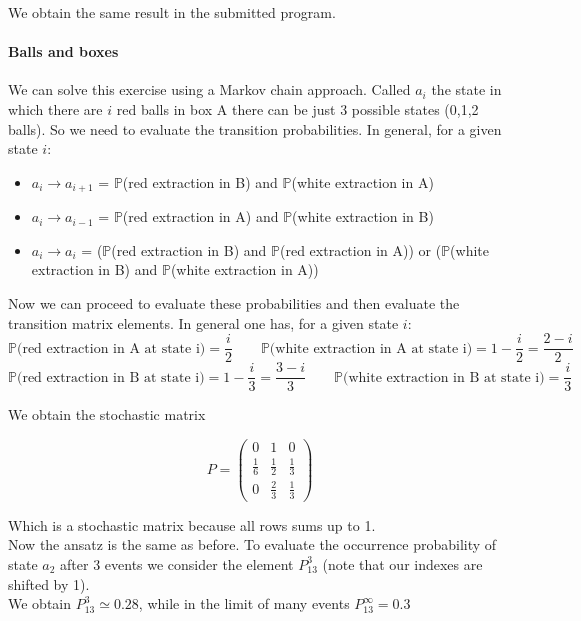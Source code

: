 We obtain the same result in the submitted program.

\paragraph*{Balls and boxes}

We can solve this exercise using a Markov chain approach.
Called $a_i$ the state in which there are $i$ red balls in box A there can be just 3 possible states (0,1,2 balls).
So we need to evaluate the transition probabilities. In general, for a given state $i$:

\begin{itemize}
\item  $a_i \to a_{i+1}$ = $\mathbb{P}$(red extraction in B) and $\mathbb{P}$(white extraction in A)
\item  $a_i \to a_{i-1}$ = $\mathbb{P}$(red extraction in A) and $\mathbb{P}$(white extraction in B)
\item  $a_i \to a_{i}$ = ($\mathbb{P}$(red extraction in B) and $\mathbb{P}$(red extraction in A)) or ($\mathbb{P}$(white extraction in B) and $\mathbb{P}$(white extraction in A))
\end{itemize}

Now we can proceed to evaluate these probabilities and then evaluate the transition matrix elements.
In general one has, for a given state $i$:
$$ \mathbb{P}\text{(red extraction in A at state i)} = \frac{i}{2} \qquad \mathbb{P}\text{(white extraction in A at state i)} = 1- \frac{i}{2} = \frac{2-i}{2} $$
$$ \mathbb{P}\text{(red extraction in B at state i)} = 1 - \frac{i}{3} =  \frac{3-i}{3} \qquad \mathbb{P}\text{(white extraction in B at state i)} = \frac{i}{3} $$

We obtain the stochastic matrix

$$ P =
\begin{pmatrix} 
0 & 1 & 0 \\
\frac{1}{6} & \frac{1}{2} & \frac{1}{3} \\
0 & \frac{2}{3} & \frac{1}{3}
\end{pmatrix}
$$

Which is a stochastic matrix because all rows sums up to 1. \\
Now the ansatz is the same as before. To evaluate the occurrence probability of state $a_2$ after 3 events we consider the element $P^3_{13}$ (note that our indexes are shifted by 1). \\
We obtain $P^3_{13} \simeq 0.28$, while in the limit of many events $P^{\infty}_{13} = 0.3$